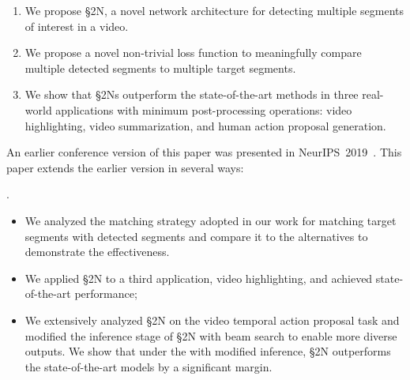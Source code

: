 \documentclass[10pt,journal,compsoc]{IEEEtran}
\begin{document}
\begin{enumerate}
	\item We propose \S2N, a novel network architecture for detecting multiple segments of interest in a video.
	\item We propose a novel non-trivial loss function to meaningfully compare  multiple detected segments to multiple target segments.
	\item We show that \S2Ns outperform the state-of-the-art methods in three real-world applications with minimum post-processing operations: video highlighting, video summarization, and human action proposal generation.
\end{enumerate}
An earlier conference version of this paper was presented in NeurIPS~2019~\cite{m_Wei-etal-NIPS18}. This paper extends the earlier version in several ways:

. 

\begin{itemize}
    \item We analyzed the matching strategy adopted in our work for matching target segments with detected segments and compare it to the alternatives to demonstrate the effectiveness.
    \item We applied \S2N to a third application, video highlighting, and achieved state-of-the-art performance;
    \item We extensively analyzed \S2N on the video temporal action proposal task and modified the inference stage of \S2N with beam search to enable more diverse outputs. We show that under the with modified inference, \S2N outperforms the state-of-the-art models by a significant margin.
\end{itemize}
\end{document}
